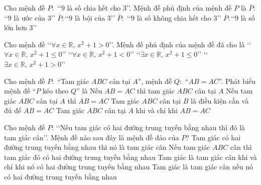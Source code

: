 \begin{ex}%
	Cho mệnh đề $P\colon$ \lq\lq  $9$ là số chia hết cho $3$\rq\rq. Mệnh đề phủ định của mệnh đề $P$ là
	\choice
	{$\overline{P}\colon$\lq\lq  $9$ là ước của $3$\rq\rq}
	{$\overline{P}\colon$\lq\lq  $9$ là bội của $3$\rq\rq}
	{\True $\overline{P}\colon$ \lq\lq  $9$ là số không chia hết cho $3$\rq\rq}
	{$\overline{P}\colon$\lq\lq  $9$ là số lớn hơn $3$\rq\rq}
\end{ex}
\begin{ex}%
	Cho mệnh đề \lq\lq$\forall x\in \mathbb{R},\, x^2+1>0$\rq \rq. Mệnh đề phủ định của mệnh đề đã cho là
	\choice
	{\lq\lq$\forall x\in \mathbb{R},\, x^2+1\leq 0$\rq \rq}
	{\lq\lq$\forall x\in \mathbb{R},\, x^2+1<0$\rq \rq}
	{\True \lq\lq$\exists x\in \mathbb{R},\, x^2+1\leq 0$\rq \rq}
	{\lq\lq$\exists x\in \mathbb{R},\, x^2+1>0$\rq \rq}
\end{ex}
\begin{ex}%
	Cho mệnh đề $P\colon$ ``Tam giác $ABC$ cân tại $A$'', mệnh đề $Q\colon$ ``$AB=AC$''. Phát biểu mệnh đề ``$P$ kéo theo $Q$'' là
	\choice
	{Nếu $AB=AC$ thì tam giác $ABC$ cân tại $A$}
	{\True Nếu tam giác $ABC$ cân tại $A$ thì $AB=AC$}
	{Tam giác $ABC$ cân tại $B$ là điều kiện cần và đủ để $AB=AC$}
	{Tam giác $ABC$ cân tại $A$ khi và chỉ khi $AB=AC$}
\end{ex}
\begin{ex}%
	Cho mệnh đề $P$: \lq\lq Nếu tam giác có hai đường trung tuyến bằng nhau thì đó là tam giác cân\rq\rq. Mệnh đề nào sau đây là mệnh đề đảo của $P$?
	\choice
	{Tam giác có hai đường trung tuyến bằng nhau thì nó là tam giác cân}
	{\True Nếu tam giác $ABC$ cân thì tam giác đó có hai đường trung tuyến bằng nhau }
	{Tam giác là tam giác cân khi và chỉ khi nó có hai đường trung tuyến bằng nhau}
	{Tam giác là tam giác cân nếu nó có hai đường trung tuyến bằng nhau}
\end{ex}
